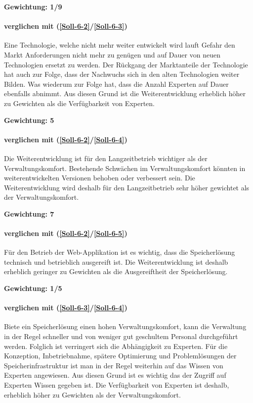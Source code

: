 \textbf{Gewichtung: 1/9}

\paragraph*{ verglichen mit  (\ref{Soll-6-2}/\ref{Soll-6-3})}
Eine Technologie, welche nicht mehr weiter entwickelt wird lauft Gefahr den Markt Anforderungen nicht mehr zu genügen und auf Dauer von neuen Technologien ersetzt zu werden. Der Rückgang der Marktanteile der Technologie hat auch zur Folge, dass der Nachwuchs sich in den alten Technologien weiter Bilden. Was wiederum zur Folge hat, dass die Anzahl Experten auf Dauer ebenfalls abnimmt. Aus diesen Grund ist die Weiterentwicklung erheblich höher zu Gewichten als die Verfügbarkeit von Experten.

\textbf{Gewichtung: 5}

\paragraph*{ verglichen mit  (\ref{Soll-6-2}/\ref{Soll-6-4})}

Die Weiterentwicklung ist für den Langzeitbetrieb wichtiger als der Verwaltungskomfort. Bestehende Schwächen im Verwaltungskomfort könnten in weiterentwickelten Versionen behoben oder verbessert sein. Die Weiterentwicklung wird deshalb für den Langzeitbetrieb sehr höher gewichtet als der Verwaltungskomfort.

\textbf{Gewichtung: 7}

\paragraph*{ verglichen mit  (\ref{Soll-6-2}/\ref{Soll-6-5})}
Für den Betrieb der Web-Applikation ist es wichtig, dass die Speicherlösung technisch und betrieblich ausgereift ist. Die Weiterentwicklung ist deshalb erheblich geringer zu Gewichten als die Ausgereiftheit der Speicherlösung.

\textbf{Gewichtung: 1/5}


\paragraph*{ verglichen mit  (\ref{Soll-6-3}/\ref{Soll-6-4})}
Biete ein Speicherlösung einen hohen Verwaltungskomfort, kann die Verwaltung in der Regel schneller und von weniger gut geschultem Personal durchgeführt werden. Folglich ist verringert sich die Abhängigkeit zu Experten. Für die Konzeption, Inbetriebnahme, spätere Optimierung und Problemlösungen der Speicherinfrastruktur ist man in der Regel weiterhin auf das Wissen von Experten angewiesen. Aus diesen Grund ist es wichtig das der Zugriff auf Experten Wissen gegeben ist. Die Verfügbarkeit von Experten ist deshalb, erheblich höher zu Gewichten als der Verwaltungskomfort. 

